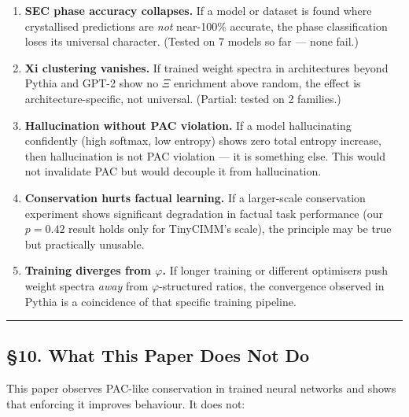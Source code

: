 \documentclass[
  11pt,
  a4paper]{article}
\begin{document}
\begin{enumerate}
\def\labelenumi{\arabic{enumi}.}
\item
  \textbf{SEC phase accuracy collapses.} If a model or dataset is found
  where crystallised predictions are \emph{not} near-100\% accurate, the
  phase classification loses its universal character. (Tested on 7
  models so far --- none fail.)
\item
  \textbf{Xi clustering vanishes.} If trained weight spectra in
  architectures beyond Pythia and GPT-2 show no \(\Xi\) enrichment above
  random, the effect is architecture-specific, not universal. (Partial:
  tested on 2 families.)
\item
  \textbf{Hallucination without PAC violation.} If a model hallucinating
  confidently (high softmax, low entropy) shows zero total entropy
  increase, then hallucination is not PAC violation --- it is something
  else. This would not invalidate PAC but would decouple it from
  hallucination.
\item
  \textbf{Conservation hurts factual learning.} If a larger-scale
  conservation experiment shows significant degradation in factual task
  performance (our \(p = 0.42\) result holds only for TinyCIMM's scale),
  the principle may be true but practically unusable.
\item
  \textbf{Training diverges from \(\varphi\).} If longer training or
  different optimisers push weight spectra \emph{away} from
  \(\varphi\)-structured ratios, the convergence observed in Pythia is a
  coincidence of that specific training pipeline.
\end{enumerate}

\begin{center}\rule{0.5\linewidth}{0.5pt}\end{center}

\subsection{§10. What This Paper Does Not
Do}\label{what-this-paper-does-not-do}

This paper observes PAC-like conservation in trained neural networks and
shows that enforcing it improves behaviour. It does not:
\end{document}
